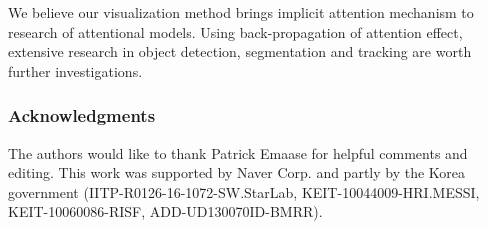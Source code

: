 \documentclass{article}
\begin{document}
We believe our visualization method brings implicit attention mechanism to research of attentional models. Using back-propagation of attention effect, extensive research in object detection, segmentation and tracking are worth further investigations.

\subsubsection*{Acknowledgments}

The authors would like to thank Patrick Emaase for helpful comments and editing. This work was supported by Naver Corp. and partly by the Korea government (IITP-R0126-16-1072-SW.StarLab, KEIT-10044009-HRI.MESSI, KEIT-10060086-RISF, ADD-UD130070ID-BMRR).




\setcounter{section}{0}
\renewcommand\theHsection{\Alph{section}}
\renewcommand\thesection{\Alph{section}}
\renewcommand\thesubsection{\thesection.\arabic{subsection}}


\end{document}
